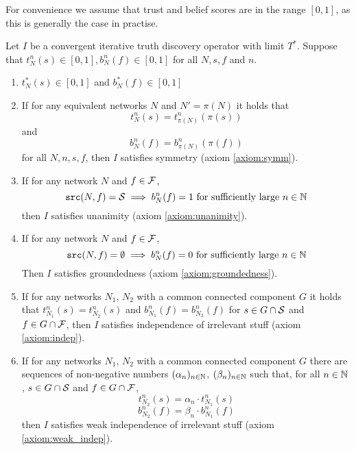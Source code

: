 \documentclass[../main.tex]{subfiles}
\begin{document}
For convenience we assume that trust and belief scores are in the range $[0,
1]$, as this is generally the case in practise.

\begin{lemma}
\label{lemma:iterative_axiom_suff_conds}
Let $I$ be a convergent iterative truth discovery operator with limit
$T^*$. Suppose that $t_N^n(s) \in [0, 1], b_N^n(f) \in [0, 1]$ for all $N, s,
f$ and $n$.

\begin{enumerate}
    \item $t_N^*(s) \in [0, 1]$ and $b_N^*(f) \in [0, 1]$

    \item If for any equivalent networks $N$ and $N'=\pi(N)$ it holds that
    \[
        t_N^n(s) = t_{\pi(N)}^n(\pi(s))
    \]
    and
    \[
        b_N^n(f) = b_{\pi(N)}^n(\pi(f))
    \]
    for all $N, n, s, f$, then $I$ satisfies symmetry (axiom \ref{axiom:symm}).

    \item If for any network $N$ and $f \in \F$,
    \[
        \src(N, f) = \S \implies b_N^n(f) = 1 \text{ for sufficiently large }
            n \in \Nat
    \]
    then $I$ satisfies unanimity (axiom \ref{axiom:unanimity}).

    \item If for any network $N$ and $f \in \F$,
    \[
        \src(N, f) = \emptyset \implies b_N^n(f) = 0
            \text{ for sufficiently large } n \in \Nat
    \]
    Then $I$ satisfies groundedness (axiom \ref{axiom:groundedness}).

    \item If for any networks $N_1$, $N_2$ with a common connected component
    $G$ it holds that $t_{N_1}^n(s) = t_{N_2}^n(s)$ and $b_{N_1}^n(f) =
    b_{N_2}^n(f)$ for $s \in G \cap \S$ and $f \in G \cap \F$, then $I$
    satisfies independence of irrelevant stuff (axiom \ref{axiom:indep}).

    \item If for any networks $N_1$, $N_2$ with a common connected component
    $G$ there are sequences of non-negative numbers $(\alpha_n)_{n \in \Nat}$,
    $(\beta_n)_{n \in \Nat}$ such that, for all $n \in \Nat$, $s \in G \cap \S$
    and $f \in G \cap \F$,
        \[ t_{N_2}^n(s) = \alpha_n \cdot t_{N_1}^n(s) \]
        \[ b_{N_2}^n(f) = \beta_n \cdot b_{N_1}^n(f) \]
    then $I$ satisfies weak independence of irrelevant stuff (axiom
    \ref{axiom:weak_indep}).

\end{enumerate}
\end{lemma}
\end{document}
